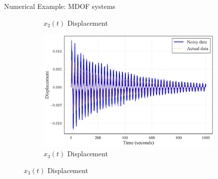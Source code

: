 \documentclass{beamer}
\begin{document}
\begin{frame}{Numerical Example: MDOF systems}
\begin{figure}[!ht]
\begin{subfigure}{0.31\textwidth}
        \caption{$x_2(t)$ Displacement}
      \end{subfigure}
      \hspace{0.5em}%
      \begin{subfigure}{0.31\textwidth}
          \centering
          \includegraphics[width=\textwidth]{noised_displacement_vs_actual_mass_3.pdf}
          \caption{$x_3(t)$ Displacement}
    \end{subfigure}
  

\end{figure}
\end{frame}
\end{document}
